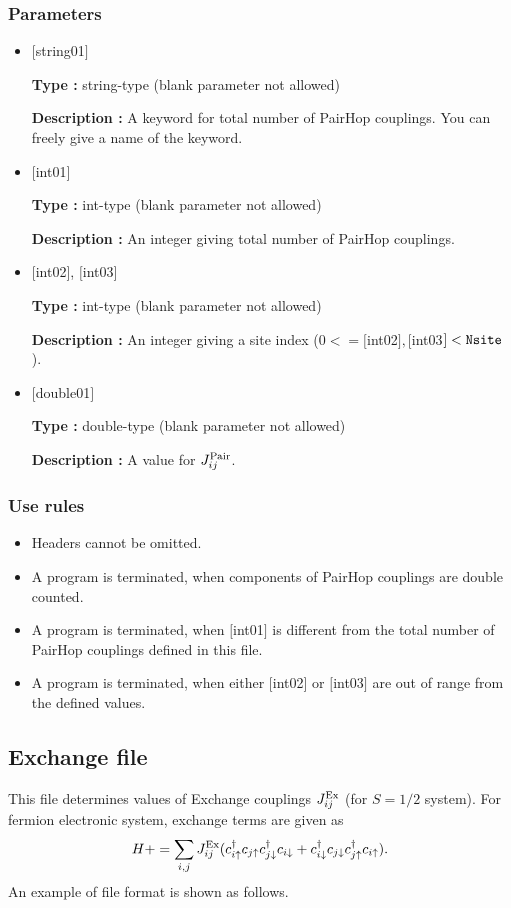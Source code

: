 \subsubsection{Parameters}
 \begin{itemize}

   \item  $[$string01$]$
   
    {\bf Type :} string-type (blank parameter not allowed)

   {\bf Description :} A keyword for total number of PairHop couplings. You can freely give a name of the keyword.

   \item  $[$int01$]$
   
    {\bf Type :} int-type (blank parameter not allowed)

   {\bf Description :}  An integer giving total number of PairHop couplings.

  \item  $[$int02$]$, $[$int03$]$
  
 {\bf Type :} int-type (blank parameter not allowed)

{\bf Description :} An integer giving a site index ($0<= [$int02$], [$int03$]<\verb|Nsite|$).
 
 \item  $[$double01$]$
   
   {\bf Type :} double-type (blank parameter not allowed)

  {\bf Description :}   A value for $J_{ij}^{\rm Pair}$.
  
\end{itemize}

\subsubsection{Use rules}
\begin{itemize}
\item Headers cannot be omitted. 
\item A program is terminated, when components of PairHop couplings are double counted.
\item A program is terminated, when $[$int01$]$ is different from the total number of PairHop couplings defined in this file.
\item A program is terminated, when either $[$int02$]$ or $[$int03$]$ are out of range from the defined values.
\end{itemize}

\newpage
\subsection{Exchange file}
This file determines values of Exchange couplings $J_{ij}^{\rm Ex}$ {(for $S=1/2$ system)}.
For fermion electronic system, exchange terms are given as
\begin{equation}
H+=\sum_{i,j}J_{ij}^{\rm Ex} (c_ {i \uparrow}^{\dag}c_{j\uparrow}c_{j \downarrow}^{\dag}c_{i  \downarrow}+c_ {i \downarrow}^{\dag}c_{j\downarrow}c_{j \uparrow}^{\dag}c_{i  \uparrow}).
\end{equation}
An example of file format is shown as follows.

